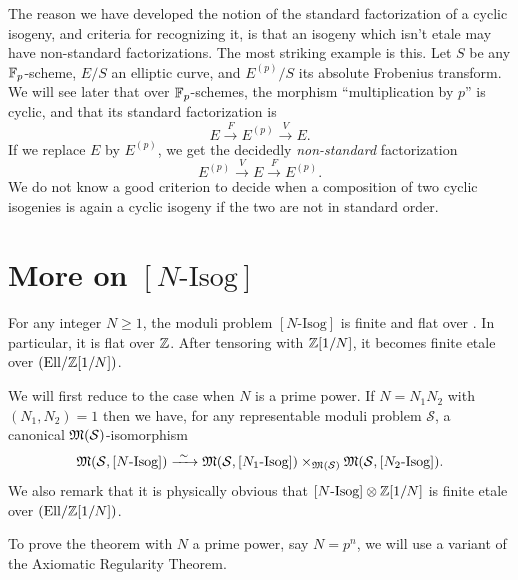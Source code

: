 \begin{krem}\label{rem:6.7.16}
The reason we have developed the notion of the standard factorization of a cyclic isogeny, and criteria for recognizing it, is that an isogeny which isn't etale may have non-standard factorizations. The most striking example is this. Let $S$ be any $\mathbb{F}_p$-scheme, $E/S$ an elliptic curve, and $E^{(p)}/S$ its absolute Frobenius transform. We will see later that over $\mathbb{F}_p$-schemes, the morphism ``multiplication by $p$'' is cyclic, and that its standard factorization is
\[
E \xrightarrow{F} E^{(p)} \xrightarrow{V} E .
\]
If we replace $E$ by $E^{(p)}$, we get the decidedly \emph{non-standard} factorization
\[
E^{(p)} \xrightarrow{V} E \xrightarrow{F} E^{(p)} .
\]
We do not know a good criterion to decide when a composition of two cyclic isogenies is again a cyclic isogeny if the two are not in standard order.
\end{krem}

\section{More on \texorpdfstring{$[N\text{-Isog}]$}{[N-Isog]}}
\label{sec:6.8}

\begin{kthm}\label{thm:6.8.1}
For any integer $N \ge 1$, the moduli problem $[N\text{-Isog}]$ is finite and flat over \Ell. In particular, it is flat over $\mathbb{Z}$. After tensoring with $\mathbb{Z}[1/N]$, it becomes finite etale over $(\mathrm{Ell}/\mathbb{Z}[1/N])$.
\end{kthm}

\begin{proof*}
We will first reduce to the case when $N$ is a prime power. If $N = N_1N_2$ with $(N_1,N_2) = 1$ then we have, for any representable moduli problem $\mathcal{S}$, a canonical $\mathfrak{M}(\mathcal{S})$-isomorphism
\[
\mathfrak{M}(\mathcal{S}, [N\text{-Isog}]) \xrightarrow{\ \sim\ } \mathfrak{M}(\mathcal{S}, [N_1\text{-Isog}]) \times_{\mathfrak{M}(\mathcal{S})} \mathfrak{M}(\mathcal{S}, [N_2\text{-Isog}]) .
\]
We also remark that it is physically obvious that $[N\text{-Isog}] \otimes \mathbb{Z}[1/N]$ is finite etale over $(\mathrm{Ell}/\mathbb{Z}[1/N])$.

To prove the theorem with $N$ a prime power, say $N = p^n$, we will use a variant of the Axiomatic Regularity Theorem.
\end{proof*}

